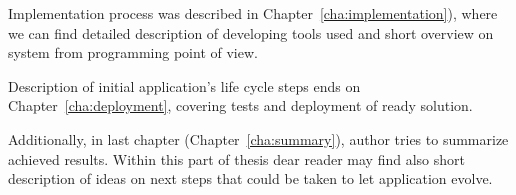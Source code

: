 Implementation process was described in Chapter~\ref{cha:implementation}), where we can find detailed description of developing tools used and short overview on system from programming point of view.

Description of initial application's life cycle steps ends on Chapter~\ref{cha:deployment}, covering tests and
deployment of ready solution.

Additionally, in last chapter (Chapter~\ref{cha:summary}), author tries to summarize achieved results. Within this part of thesis dear reader may find also short description of ideas on next steps that could be taken to let application evolve.





